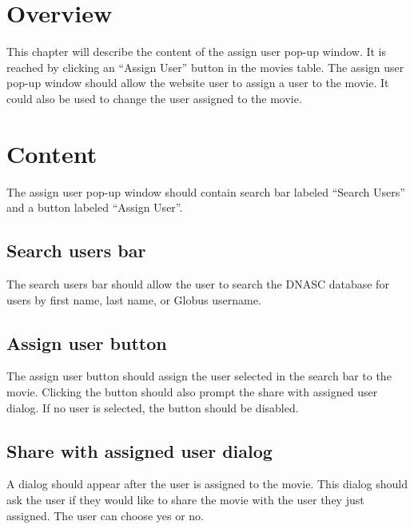 
\section{Overview}

This chapter will describe the content of the assign user pop-up window.
It is reached by clicking an ``Assign User'' button in the movies table.
The assign user pop-up window should allow the website user to assign a
user to the movie. It could also be used to change the user assigned
to the movie.

\section{Content}

The assign user pop-up window should contain search bar labeled ``Search Users''
and a button labeled ``Assign User''.

\subsection{Search users bar}

The search users bar should allow the user to search the DNASC database for users by first 
name, last name, or Globus username.

\subsection{Assign user button}

The assign user button should assign the user selected in the search bar to the movie.
Clicking the button should also prompt the share with assigned user dialog. If no user 
is selected, the button should be disabled.

\subsection{Share with assigned user dialog}

A dialog should appear after the user is assigned to the movie. This dialog should
ask the user if they would like to share the movie with the user they just assigned.
The user can choose yes or no. 